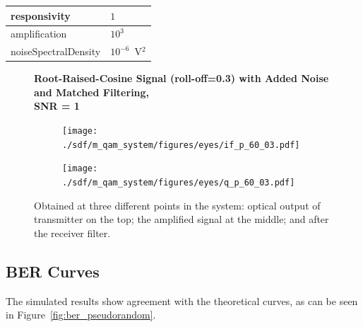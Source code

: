 \begin{refsection}
\begin{table}[H]
\begin{tabular}{|l|l|}
		responsivity           & $1$                                                        \\ \hline
		amplification          & $10^3$                                                     \\ \hline
		noiseSpectralDensity   & $10^{-6}$~V$^2$                             					\\ \hline
	\end{tabular}
\end{table}
\begin{figure}[H]
		\centering
	\textbf{Root-Raised-Cosine Signal (roll-off=0.3) with Added Noise and Matched Filtering,\\ SNR = 1}
	\begin{minipage}{\linewidth}
		\centering
	\begin{subfigure}{.45\textwidth}
		\centering
		\texttt{[image: ./sdf/m\_qam\_system/figures/eyes/if\_p\_60\_03.pdf]}
	\end{subfigure}
	\begin{subfigure}{.45\textwidth}
		\centering
		\texttt{[image: ./sdf/m\_qam\_system/figures/eyes/q\_p\_60\_03.pdf]}
	\end{subfigure}
	
	\caption{
		Obtained at three different points in the system: optical output of transmitter on the top;
		the amplified signal at the middle; and
		after the receiver filter.
		\label{fig:eyes_n_rc_60_03}}
	\end{minipage}
\end{figure}



\subsection{BER Curves}

The simulated results show agreement with the theoretical curves, as can be seen in Figure~\ref{fig:ber_pseudorandom}.


\end{refsection}
